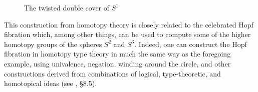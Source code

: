 \documentclass[11pt]{article}
\theoremstyle{remark}
\theoremstyle{definition}
\begin{document}
\begin{figure}\centering
  \caption{The twisted double cover of $S^1$}\label{fig:winding}
\end{figure}
%
This construction from homotopy theory is closely related to the celebrated Hopf fibration which, among other things, can be used to compute some of the higher homotopy groups of the spheres $S^2$ and $S^3$.  Indeed, one can construct the Hopf fibration in homotopy type theory in much the same way as the foregoing example, using univalence, negation, winding around the circle, and other constructions derived from combinations of logical, type-theoretic, and homotopical ideas (see \cite{HoTTbook}, \S 8.5). 

\end{document}
